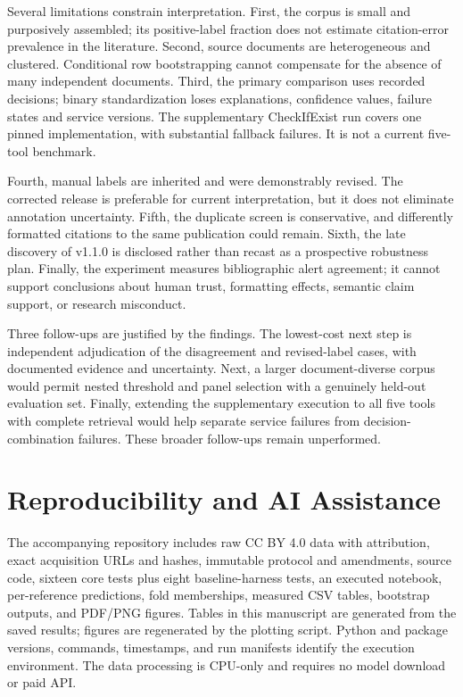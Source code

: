 \documentclass[acmsmall,screen,nonacm]{acmart}
\begin{document}
Several limitations constrain interpretation. First, the corpus is small and purposively assembled; its positive-label fraction does not estimate citation-error prevalence in the literature. Second, source documents are heterogeneous and clustered. Conditional row bootstrapping cannot compensate for the absence of many independent documents. Third, the primary comparison uses recorded decisions; binary standardization loses explanations, confidence values, failure states and service versions. The supplementary CheckIfExist run covers one pinned implementation, with substantial fallback failures. It is not a current five-tool benchmark.

Fourth, manual labels are inherited and were demonstrably revised. The corrected release is preferable for current interpretation, but it does not eliminate annotation uncertainty. Fifth, the duplicate screen is conservative, and differently formatted citations to the same publication could remain. Sixth, the late discovery of v1.1.0 is disclosed rather than recast as a prospective robustness plan. Finally, the experiment measures bibliographic alert agreement; it cannot support conclusions about human trust, formatting effects, semantic claim support, or research misconduct.

Three follow-ups are justified by the findings. The lowest-cost next step is independent adjudication of the disagreement and revised-label cases, with documented evidence and uncertainty. Next, a larger document-diverse corpus would permit nested threshold and panel selection with a genuinely held-out evaluation set. Finally, extending the supplementary execution to all five tools with complete retrieval would help separate service failures from decision-combination failures. These broader follow-ups remain unperformed.

\section{Reproducibility and AI Assistance}
The accompanying repository includes raw CC BY 4.0 data with attribution, exact acquisition URLs and hashes, immutable protocol and amendments, source code, sixteen core tests plus eight baseline-harness tests, an executed notebook, per-reference predictions, fold memberships, measured CSV tables, bootstrap outputs, and PDF/PNG figures. Tables in this manuscript are generated from the saved results; figures are regenerated by the plotting script. Python and package versions, commands, timestamps, and run manifests identify the execution environment. The data processing is CPU-only and requires no model download or paid API.
\end{document}
